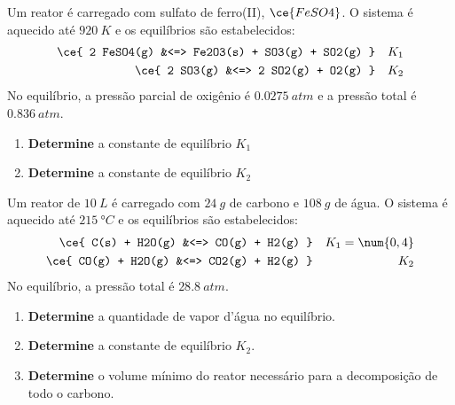 \begin{problem}[
	id={2F72},
	path={/home/braun/Documents/Developer/braunchem/data/problems/Q2/2F/2F72}
]
Um reator é carregado com sulfato de ferro(II), {\(\ce{FeSO4}\)}. O sistema é aquecido até {\(\qty{920}{\unit{K}}\)} e os equilíbrios são
estabelecidos: {\[
\begin{aligned}
    \ce{ 2 FeSO4(g) &<=> Fe2O3(s) + SO3(g) + SO2(g) }
&& K_1 \\
    \ce{ 2 SO3(g) &<=> 2 SO2(g) + O2(g) } && K_2
\end{aligned}
\]} No equilíbrio, a pressão parcial de oxigênio é {\(\qty{0,0275}{\unit{atm}}\)} e a pressão total é {\(\qty{0,836}{\unit{atm}}\)}.

\begin{enumerate}
\def\labelenumi{\alph{enumi}.}
\tightlist
\item
  \textbf{Determine} a constante de equilíbrio {\(K_1\)}
\item
  \textbf{Determine} a constante de equilíbrio {\(K_2\)}
\end{enumerate}

\end{problem}


\begin{problem}[
	id={2F73},
	path={/home/braun/Documents/Developer/braunchem/data/problems/Q2/2F/2F73}
]
Um reator de {\(\qty{10}{\unit{L}}\)} é carregado com {\(\qty{24}{\unit{g}}\)} de carbono e {\(\qty{108}{\unit{g}}\)} de água. O sistema é aquecido
até {\(\qty{215}{\unit{\degree C}}\)} e os equilíbrios são estabelecidos: {\[
\begin{aligned}
    \ce{ C(s) + H2O(g) &<=> CO(g) + H2(g) } && K_1 =
\num{0,4} \\
    \ce{ CO(g) + H2O(g) &<=> CO2(g) + H2(g) } && K_2
\end{aligned}
\]} No equilíbrio, a pressão total é {\(\qty{28,8}{\unit{atm}}\)}.

\begin{enumerate}
\def\labelenumi{\alph{enumi}.}
\tightlist
\item
  \textbf{Determine} a quantidade de vapor d'água no equilíbrio.
\item
  \textbf{Determine} a constante de equilíbrio {\(K_2\)}.
\item
  \textbf{Determine} o volume mínimo do reator necessário para a decomposição de todo o carbono.
\end{enumerate}

\end{problem}



